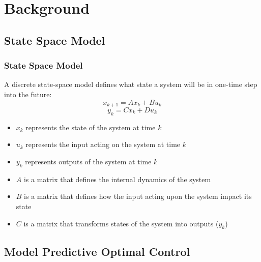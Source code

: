 \documentclass{beamer}
\begin{document}
\section{Background}
\subsection{State Space Model}
\begin{frame}
\frametitle{State Space Model}
A discrete state-space model defines what state a system will be in one-time step into the future:
\begin{equation}
\label{eq:xk}
x_{k+1}=A x_k + B u_k 
\end{equation}  
\begin{equation}
\label{eq:yk}
y_{k}=C x_k + D u_k  
\end{equation}  
\begin{itemize}
  \item $x_k$ represents the state of the system at time $k$
  \item $u_k$ represents the input acting on the system at time $k$
  \item $y_k$ represents outputs of the system at time $k$
  \item $A$ is a matrix that defines the internal dynamics of the system
  \item $B$ is a matrix that defines how the input acting upon the system impact its state
  \item $C$ is a matrix that transforms states of the system into outputs ($y_k$)
\end{itemize}
\end{frame}


\subsection{Model Predictive Optimal Control}
\end{document}
